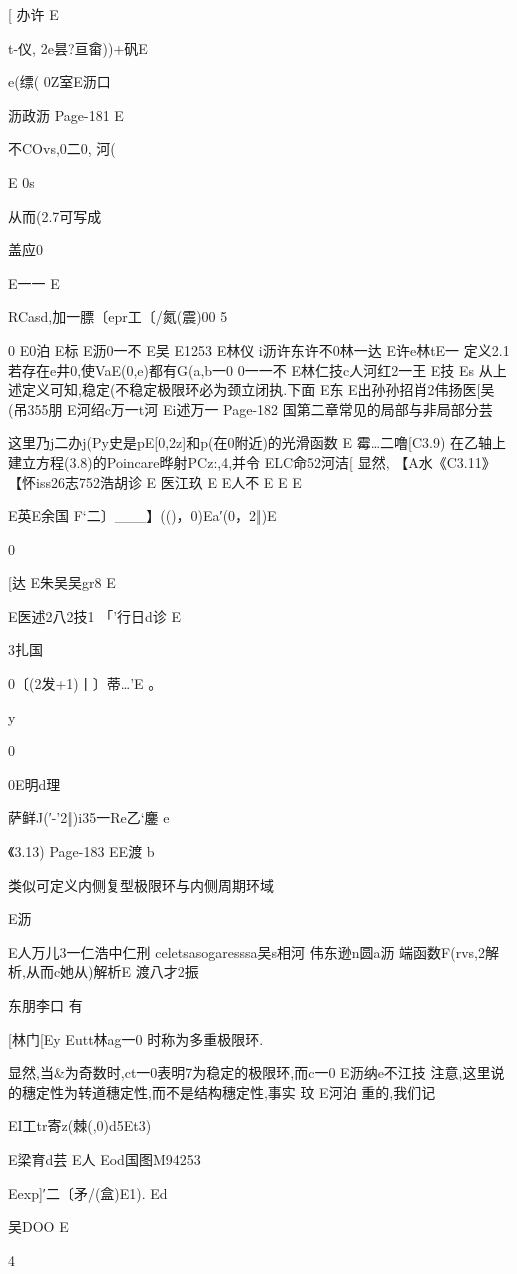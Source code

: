 {{{{{{{{{{{{{{{{{{{[
办许
E

t-仪,
2e昙?亘畲))+矾E

e(缥(
0Z室E沥口

沥政沥
Page-181
E

不COvs,0二0,
河(

E
0s

从而(2.7可写成

盖应0

E一一
E

RCasd,加一膘〔epr工〔/氮(震)00
5

0
E0泊
E标
E沥0一不
E吴
E1253
E林仪
i沥许东许不0林一达
E许e林tE一
定义2.1若存在e井0,使VaE(0,e)都有G(a,b一0
0一一不
E林仁技c人河红2一王
E技
Es
从上述定义可知,稳定(不稳定极限环必为颈立闭执.下面
E东
E出孙孙招肖2伟扬医[吴(吊355朋
E河绍c万一t河
Ei述万一
Page-182
国第二章常见的局部与非局部分芸

这里乃j二办j(Py史是pE[0,2z]和p(在0附近)的光滑函数
E
霉…二噜[C3.9)
在乙轴上建立方程(3.8)的Poincare晔射PCz:,4,并令
ELC命52河洁[
显然,
【A水《C3.11》
【怀iss26志752浩胡诊
E
医江玖
E
E人不
E
E
E

E英E余国
F`二〕___】(()，0)Ea′(0，2‖)E

0

[达
E朱吴吴gr8
E

E医述2八2技1
「'行日d诊
E

3扎国

0〔(2发+1)丨〕蒂…'E
。

y

0

0E明d理

萨鲜J(′-'2‖)i35一Re乙`鏖
e

《3.13)
Page-183
EE渡
b

类似可定义内侧复型极限环与内侧周期环域

E沥

E人万儿3一仁浩中仁刑
celetsasogaresssa吴s相河
伟东逊n圆a沥
端函数F(rvs,2解析,从而c她从)解析E
渡八才2振

东朋李口
有

[林门[Ey
Eutt林ag一0
时称为多重极限环.

显然,当&为奇数时,ct一0表明7为稳定的极限环,而c一0
E沥纳e不江技
注意,这里说的穗定性为转道穗定性,而不是结构穗定性,事实
玟
E河泊
重的,我们记

EI工tr寄z(棘(,0)d5Et3)

E梁育d芸
E人
Eod国图M94253

Eexp]′二〔矛/(盒)E1).
Ed

吴DOO
E

4

}}}}}}}}}}}}}}}}}}}
